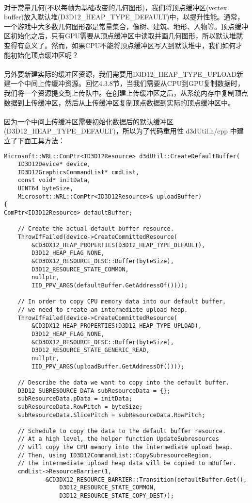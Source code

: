 \begin{flushleft}
~\\
对于常量几何(不以每帧为基础改变的几何图形)，我们将顶点缓冲区(vertex buffer)放入默认堆(D3D12\_HEAP\_TYPE\_DEFAULT)中，以提升性能。通常，一个游戏中大多数几何图形都是常量集合，像树、建筑、地形、人物等。顶点缓冲区初始化之后，只有GPU需要从顶点缓冲区中读取并画几何图形，所以默认堆就变得有意义了。然而，如果CPU不能将顶点缓冲区写入到默认堆中，我们如何才能初始化顶点缓冲区呢？\\
~\\
另外要新建实际的缓冲区资源，我们需要用D3D12\_HEAP\_TYPE\_UPLOAD新建一个中间上传缓冲资源。回忆4.3.8节，当我们需要从CPU到GPU复制数据时，我们将一个资源提交到上传队中。在创建上传缓冲区之后，从系统内存中复制顶点数据到上传缓冲区，然后从上传缓冲区复制顶点数据到实际的顶点缓冲区中。\\
~\\
因为一个中间上传缓冲区需要初始化数据后的默认缓冲区(D3D12\_HEAP\_TYPE\_DEFAULT)，所以为了代码重用性 d3dUtil.h/cpp 中建立了下面工具方法：
\begin{lstlisting}
Microsoft::WRL::ComPtr<ID3D12Resource> d3dUtil::CreateDefaultBuffer(
    ID3D12Device* device,
    ID3D12GraphicsCommandList* cmdList,
    const void* initData,
    UINT64 byteSize,
    Microsoft::WRL::ComPtr<ID3D12Resource>& uploadBuffer)
{
ComPtr<ID3D12Resource> defaultBuffer;

    // Create the actual default buffer resource.
    ThrowIfFailed(device->CreateCommittedResource(
        &CD3DX12_HEAP_PROPERTIES(D3D12_HEAP_TYPE_DEFAULT),
        D3D12_HEAP_FLAG_NONE,
        &CD3DX12_RESOURCE_DESC::Buffer(byteSize),
        D3D12_RESOURCE_STATE_COMMON,
        nullptr,
        IID_PPV_ARGS(defaultBuffer.GetAddressOf())));

    // In order to copy CPU memory data into our default buffer, 
    // we need to create an intermediate upload heap. 
    ThrowIfFailed(device->CreateCommittedResource(
        &CD3DX12_HEAP_PROPERTIES(D3D12_HEAP_TYPE_UPLOAD),
        D3D12_HEAP_FLAG_NONE,
        &CD3DX12_RESOURCE_DESC::Buffer(byteSize),
        D3D12_RESOURCE_STATE_GENERIC_READ,
        nullptr,
        IID_PPV_ARGS(uploadBuffer.GetAddressOf())));

    // Describe the data we want to copy into the default buffer.
    D3D12_SUBRESOURCE_DATA subResourceData = {};
    subResourceData.pData = initData;
    subResourceData.RowPitch = byteSize;
    subResourceData.SlicePitch = subResourceData.RowPitch;

    // Schedule to copy the data to the default buffer resource.  
    // At a high level, the helper function UpdateSubresources
    // will copy the CPU memory into the intermediate upload heap.  
    // Then, using ID3D12CommandList::CopySubresourceRegion,
    // the intermediate upload heap data will be copied to mBuffer.
    cmdList->ResourceBarrier(1, 
            &CD3DX12_RESOURCE_BARRIER::Transition(defaultBuffer.Get(), 
                D3D12_RESOURCE_STATE_COMMON, 
                D3D12_RESOURCE_STATE_COPY_DEST));


\end{lstlisting}
\end{flushleft}
